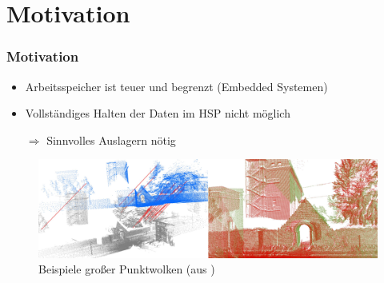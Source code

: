 \documentclass[presentation]{beamer}
\begin{document}
\section{Motivation} 
\begin{frame}
	\frametitle{Motivation}
	\begin{itemize}
		\item Arbeitsspeicher ist teuer und begrenzt (Embedded Systemen)
		\item Vollständiges Halten der Daten im HSP nicht möglich
		\item [$\Rightarrow$] Sinnvolles Auslagern nötig
	\end{itemize}
	\begin{figure}
	\includegraphics[width=1\linewidth]{figures/introduction/registration_combined.png}
	\caption{Beispiele großer Punktwolken (aus \cite{PCLReg})}
	\end{figure} 
\end{frame}
\end{document}
